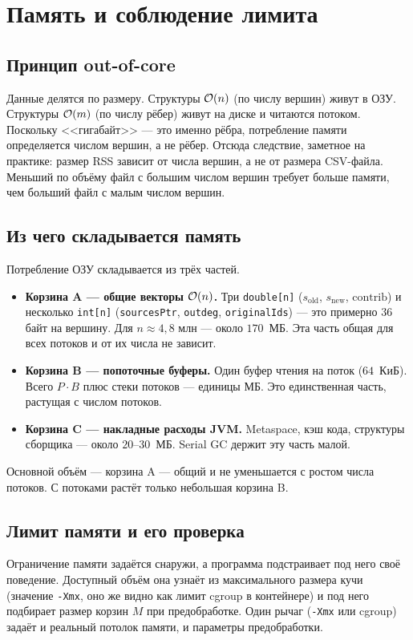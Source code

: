 \section{Память и соблюдение лимита}
\label{sec:memory}

\subsection{Принцип out-of-core}
Данные делятся по размеру. Структуры $\mathcal{O}(n)$ (по числу вершин) живут в ОЗУ. Структуры $\mathcal{O}(m)$
(по числу рёбер) живут на диске и читаются потоком. Поскольку <<гигабайт>> --- это именно рёбра,
потребление памяти определяется числом вершин, а не рёбер. Отсюда следствие, заметное на практике:
размер RSS зависит от числа вершин, а не от размера CSV-файла. Меньший по объёму файл с большим
числом вершин требует больше памяти, чем больший файл с малым числом вершин.

\subsection{Из чего складывается память}
\label{sec:buckets}
Потребление ОЗУ складывается из трёх частей.
\begin{itemize}[itemsep=3pt]
  \item \textbf{Корзина A --- общие векторы $\mathcal{O}(n)$.} Три \texttt{double[n]} ($s_{\mathrm{old}}$,
        $s_{\mathrm{new}}$, $\mathrm{contrib}$) и несколько \texttt{int[n]} (\texttt{sourcesPtr},
        \texttt{outdeg}, \texttt{originalIds}) --- это примерно $36$ байт на вершину. Для
        $n\approx 4{,}8$ млн --- около $170$~МБ. Эта часть общая для всех потоков и от их числа не
        зависит.
  \item \textbf{Корзина B --- попоточные буферы.} Один буфер чтения на поток ($64$~КиБ). Всего
        $P\cdot B$ плюс стеки потоков --- единицы МБ. Это единственная часть, растущая с числом
        потоков.
  \item \textbf{Корзина C --- накладные расходы JVM.} Metaspace, кэш кода, структуры сборщика ---
        около $20$--$30$~МБ. Serial GC держит эту часть малой.
\end{itemize}
Основной объём --- корзина A --- общий и не уменьшается с ростом числа потоков. С потоками растёт
только небольшая корзина B.

\subsection{Лимит памяти и его проверка}
\label{sec:cap}
Ограничение памяти задаётся снаружи, а программа подстраивает под него своё поведение. Доступный объём
она узнаёт из максимального размера кучи (значение \texttt{-Xmx}, оно же видно как лимит cgroup в
контейнере) и под него подбирает размер корзин $M$ при предобработке. Один рычаг (\texttt{-Xmx} или
cgroup) задаёт и реальный потолок памяти, и параметры предобработки.

